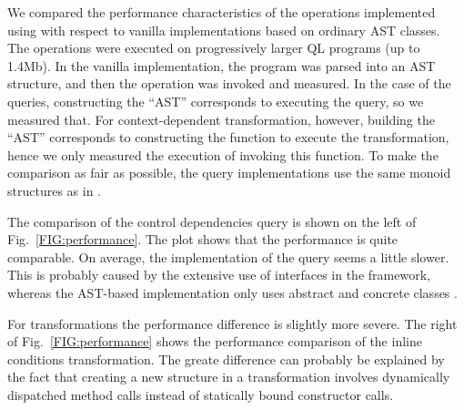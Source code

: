 We compared the performance characteristics of the operations implemented using \name with respect to vanilla implementations based on ordinary AST classes.
The operations were executed on progressively larger QL programs (up to 1.4Mb).
In the vanilla implementation, the program was parsed into an AST structure, and then the operation was invoked and measured.
In the case of the \name queries, constructing the ``AST'' corresponds to executing the query, so we measured that.
For context-dependent transformation, however, building the ``AST'' corresponds to constructing the function to execute the transformation, hence we only measured the execution of invoking this function. 
To make the comparison as fair as possible, the query implementations use the same monoid structures as in \name.

The comparison of the control dependencies query is shown on the left of Fig.~\ref{FIG:performance}.
The plot shows that the performance is quite comparable.
On average, the \name implementation of the query seems a little slower.
This is probably caused by the extensive use of interfaces in the \name framework, whereas the AST-based implementation only uses abstract and concrete classes .

For transformations the performance difference is slightly more severe.
The right of Fig.~\ref{FIG:performance} shows the performance comparison of the inline conditions transformation. 
The greate difference can probably be explained by the fact that creating a new structure in a \name transformation involves dynamically dispatched method calls instead of statically bound constructor calls. 




